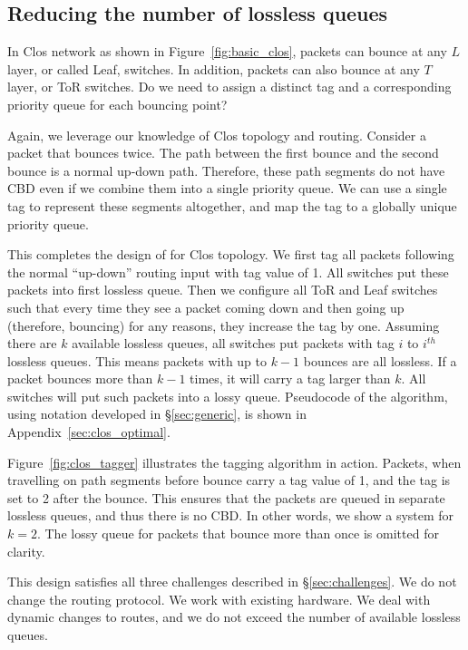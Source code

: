\subsection{Reducing the number of lossless queues}
\label{subsec:combine}

In Clos network as shown in Figure~\ref{fig:basic_clos}, packets can
bounce at any $L$ layer, or called Leaf, switches. In addition, packets can also
bounce at any $T$ layer, or ToR switches. Do we need to assign a distinct tag
and a corresponding priority queue for each bouncing point? 

Again, we leverage our knowledge of Clos topology and routing. Consider a packet
that bounces twice. The path between the first bounce and the second bounce is a
normal up-down path. Therefore, these path segments do not have CBD even if we
combine them into a single priority queue. We can use a single tag to represent
these segments altogether, and map the tag to a globally unique priority queue.

This completes the design of \sysname{} for Clos topology.  We first tag all
packets following the normal ``up-down'' routing input with tag value of 1. All
switches put these packets into first lossless queue. Then we configure all ToR
and Leaf switches such that every time they see a packet coming down and then
going up (therefore, bouncing) for any reasons, they increase the tag by one.
Assuming there are $k$ available lossless queues, all switches put packets with
tag $i$ to $i^{th}$ lossless queues. This means packets with up to $k-1$ bounces
are all lossless. If a packet bounces more than $k-1$ times, it will carry a tag
larger than $k$. All switches will put such packets into a lossy queue.
Pseudocode of the algorithm, using notation developed in \S\ref{sec:generic}, is
shown in Appendix~\ref{sec:clos_optimal}.

Figure~\ref{fig:clos_tagger} illustrates the tagging algorithm in
action.  Packets, when travelling on path segments before bounce carry a tag
value of 1, and the tag is set to 2 after the bounce. This ensures that the
packets are queued in separate lossless queues, and thus there is no CBD. In
other words, we show a system for $k=2$. The lossy queue for packets that bounce
more than once is omitted for clarity. 

This design satisfies all three challenges described in
\S\ref{sec:challenges}. We do not change the routing protocol. We work with
existing hardware. We deal with dynamic changes to routes, and we do not exceed
the number of available lossless queues.

